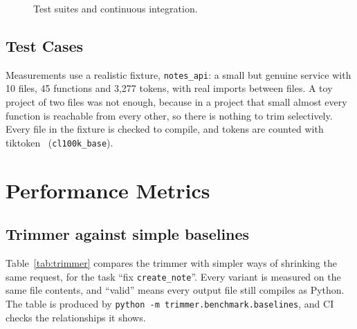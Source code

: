 \documentclass[12pt, a4paper, oneside]{report}
\newcommand{\code}[1]{\texttt{#1}}
\begin{document}
\begin{figure}[H]
\centering
{}
\caption{Test suites and continuous integration.}
\label{fig:testing}
\end{figure}

\subsection{Test Cases}
\label{sec:testcases}



Measurements use a realistic fixture, \code{notes\_api}: a small but genuine
service with 10 files, 45 functions and 3,277 tokens, with real imports between
files. A toy project of two files was not enough, because in a project that small
almost every function is reachable from every other, so there is nothing to trim
selectively. Every file in the fixture is checked to compile, and tokens are
counted with tiktoken~\cite{tiktoken} (\code{cl100k\_base}).

\section{Performance Metrics}

\subsection{Trimmer against simple baselines}

Table~\ref{tab:trimmer} compares the trimmer with simpler ways of shrinking the
same request, for the task ``fix \code{create\_note}''. Every variant is measured
on the same file contents, and ``valid'' means every output file still compiles
as Python. The table is produced by \code{python -m trimmer.benchmark.baselines},
and CI checks the relationships it shows.
\end{document}
